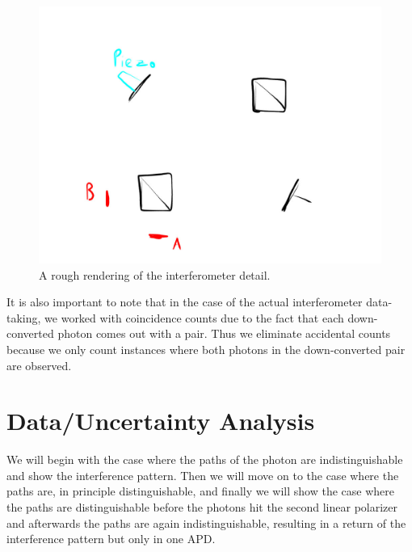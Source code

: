 \documentclass{article}
\begin{document}
\begin{figure}[!htb]
	\centering
	\includegraphics[scale=.3]{interferometer_sketch.jpg}
	\caption{A rough rendering of the interferometer detail.}
\end{figure}

It is also important to note that in the case of the actual interferometer data-taking, we worked with coincidence counts due to the fact that each down-converted photon comes out with a pair.  Thus we eliminate accidental counts because we only count instances where both photons in the down-converted pair are observed.



\section{Data/Uncertainty Analysis}

We will begin with the case where the paths of the photon are indistinguishable and show the interference pattern.  Then we will move on to the case where the paths are, in principle distinguishable, and finally we will show the case where the paths are distinguishable before the photons hit the second linear polarizer and afterwards the paths are again indistinguishable, resulting in a return of the interference pattern but only in one APD.
\end{document}
